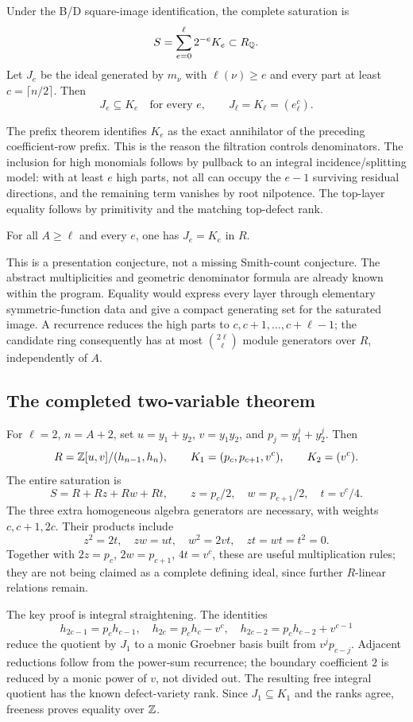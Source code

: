 \begin{theorem}
Under the B/D square-image identification, the complete saturation is
\[
 S=\sum_{e=0}^{\ell}2^{-e}K_e\subset R_\mathbb Q.
\]
Let $J_e$ be the ideal generated by $m_\nu$ with $\ell(\nu)\ge e$ and every part at least $c=\lceil n/2\rceil$. Then
\[
 J_e\subseteq K_e\quad\text{for every }e,\qquad
 J_\ell=K_\ell=(e_\ell^c).
\]
\end{theorem}
The prefix theorem identifies $K_e$ as the exact annihilator of the preceding coefficient-row prefix. This is the reason the filtration controls denominators. The inclusion for high monomials follows by pullback to an integral incidence/splitting model: with at least $e$ high parts, not all can occupy the $e-1$ surviving residual directions, and the remaining term vanishes by root nilpotence. The top-layer equality follows by primitivity and the matching top-defect rank.

\begin{conjecture}
For all $A\ge\ell$ and every $e$, one has $J_e=K_e$ in $R$.
\end{conjecture}
This is a presentation conjecture, not a missing Smith-count conjecture. The abstract multiplicities and geometric denominator formula are already known within the program. Equality would express every layer through elementary symmetric-function data and give a compact generating set for the saturated image. A recurrence reduces the high parts to $c,c+1,\ldots,c+\ell-1$; the candidate ring consequently has at most $\binom{2\ell}{\ell}$ module generators over $R$, independently of $A$.

\subsection{The completed two-variable theorem}
For $\ell=2$, $n=A+2$, set $u=y_1+y_2$, $v=y_1y_2$, and $p_j=y_1^j+y_2^j$. Then
\[
 R=\mathbb Z[u,v]/(h_{n-1},h_n),\qquad
 K_1=(p_c,p_{c+1},v^c),\qquad K_2=(v^c).
\]
The entire saturation is
\[
 S=R+Rz+Rw+Rt,\qquad z=p_c/2,\quad w=p_{c+1}/2,\quad t=v^c/4.
\]
The three extra homogeneous algebra generators are necessary, with weights $c,c+1,2c$. Their products include
\[
 z^2=2t,\quad zw=ut,\quad w^2=2vt,\quad zt=wt=t^2=0.
\]
Together with $2z=p_c$, $2w=p_{c+1}$, $4t=v^c$, these are useful multiplication rules; they are not being claimed as a complete defining ideal, since further $R$-linear relations remain.

The key proof is integral straightening. The identities
\[
 h_{2c-1}=p_ch_{c-1},\quad h_{2c}=p_ch_c-v^c,\quad
 h_{2c-2}=p_ch_{c-2}+v^{c-1}
\]
reduce the quotient by $J_1$ to a monic Groebner basis built from $v^jp_{c-j}$. Adjacent reductions follow from the power-sum recurrence; the boundary coefficient $2$ is reduced by a monic power of $v$, not divided out. The resulting free integral quotient has the known defect-variety rank. Since $J_1\subseteq K_1$ and the ranks agree, freeness proves equality over $\mathbb Z$.

